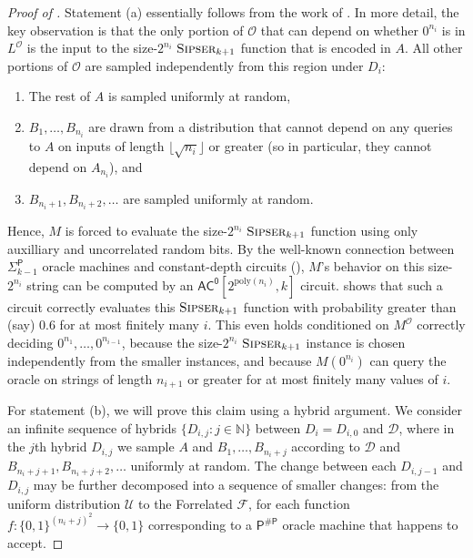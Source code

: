 \documentclass[11pt]{article}%
\newcommand{\Naturals}{\mathbb{N}}
\newcommand{\poly}{\mathrm{poly}}
\newcommand{\Sipser}{\normalfont\textsc{Sipser}}
\begin{document}
\begin{proof}[Proof of ]
Statement (a) essentially follows from the work of \cite{HRST17}. In more detail, the key observation is that the only portion of $\mathcal{O}$ that can depend on whether $0^{n_i}$ is in $L^\mathcal{O}$ is the input to the size-$2^{n_i}$ $\Sipser_{k+1}$ function that is encoded in $A$. All other portions of $\mathcal{O}$ are sampled independently from this region under $D_i$:
\begin{enumerate}
\item The rest of $A$ is sampled uniformly at random,
\item $B_1,\ldots,B_{n_i}$ are drawn from a distribution that cannot depend on any queries to $A$ on inputs of length $\lfloor \sqrt{n_i} \rfloor$ or greater (so in particular, they cannot depend on $A_{n_i}$), and
\item $B_{n_i+1}, B_{n_i + 2},\ldots$ are sampled uniformly at random.
\end{enumerate}
Hence, $M$ is forced to evaluate the size-$2^{n_i}$ $\Sipser_{k+1}$ function using only auxilliary and uncorrelated random bits. By the well-known connection between $\mathsf{\Sigma}_{k-1}^\mathsf{P}$ oracle machines and constant-depth circuits (), $M$'s behavior on this size-$2^{n_i}$ string can be computed by an $\mathsf{AC^0}\left[2^{\poly(n_i)}, k\right]$ circuit.  shows that such a circuit correctly evaluates this $\Sipser_{k+1}$ function with probability greater than (say) 0.6 for at most finitely many $i$. This even holds conditioned on $M^\mathcal{O}$ correctly deciding $0^{n_1},\dots,0^{n_{i-1}}$, because the size-$2^{n_i}$ $\Sipser_{k+1}$ instance is chosen independently from the smaller instances, and because $M\left(0^{n_i}\right)$ can query the oracle on strings of length $n_{i+1}$ or greater for at most finitely many values of $i$.

For statement (b), we will prove this claim using a hybrid argument. We consider an infinite sequence of hybrids $\{D_{i,j} : j \in \Naturals\}$ between $D_i = D_{i,0}$ and $\mathcal{D}$, where in the $j$th hybrid $D_{i,j}$ we sample $A$ and $B_1,\ldots,B_{n_i + j}$ according to $\mathcal{D}$ and $B_{n_i + j + 1}, B_{n_i + j+2}, \ldots$ uniformly at random. The change between each $D_{i,j-1}$ and $D_{i,j}$ may be further decomposed into a sequence of smaller changes: from the uniform distribution $\mathcal{U}$ to the Forrelated $\mathcal{F}$, for each function $f: \{0,1\}^{(n_i + j)^2} \to \{0,1\}$ corresponding to a $\mathsf{P^{\# P}}$ oracle machine that happens to accept. 


\end{proof}
\end{document}
